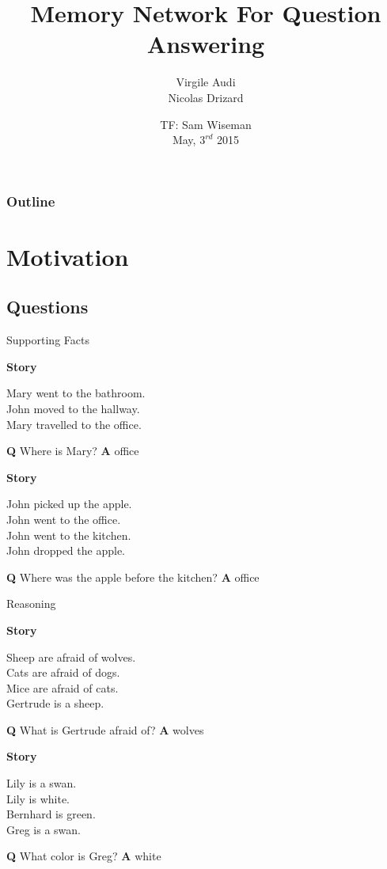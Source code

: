 \documentclass[pdf]{beamer}
\author{Virgile Audi \\ Nicolas Drizard}
\date{TF: Sam Wiseman \\ May, $3^{rd}$ 2015}
\title{Memory Network For Question Answering}
\begin{document}
\begin{frame}
\titlepage
\end{frame}

\begin{frame}
\frametitle{Outline}
\tableofcontents
\end{frame}


\section{Motivation}

\subsection{Questions}
\begin{frame}{Supporting Facts}

\textbf{Story} 
\begin{center}
Mary went to the bathroom.\\
John moved to the hallway.\\
Mary travelled to the office.
\end{center}

\textbf{Q} Where is Mary? \textbf{A} office

\textbf{Story} 
\begin{center}
John picked up the apple.\\
John went to the office.\\
John went to the kitchen.\\
John dropped the apple.
\end{center}

\textbf{Q} Where was the apple before the kitchen? \textbf{A} office
\end{frame}

\begin{frame}{Reasoning}

\textbf{Story} 
\begin{center}
Sheep are afraid of wolves.\\
Cats are afraid of dogs.\\
Mice are afraid of cats.\\
Gertrude is a sheep.
\end{center}

\textbf{Q} What is Gertrude afraid of? \textbf{A} wolves

\textbf{Story}
\begin{center}
Lily is a swan.\\
Lily is white.\\
Bernhard is green.\\
Greg is a swan.
\end{center}

\textbf{Q} What color is Greg? \textbf{A} white
\end{frame}
\end{document}
